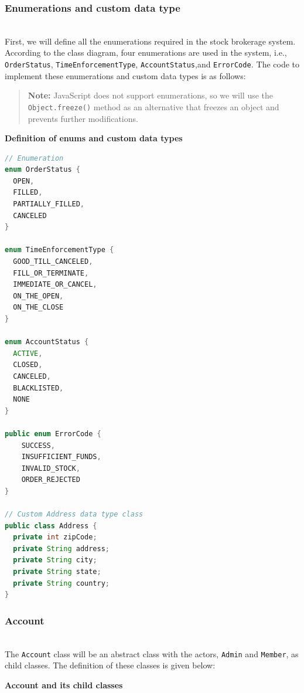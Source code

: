 \subsubsection{Enumerations and custom data type}\label{rOVMnzwZwv3Sg9LbBzNXQ}
\\
First, we will define all the enumerations required in the stock brokerage system. According to the class diagram, four enumerations are used in the system, i.e., \texttt{OrderStatus}, \texttt{TimeEnforcementType}, \texttt{AccountStatus},and \texttt{ErrorCode}\emph{.} The code to implement these enumerations and custom data types is as follows:
\begin{quote}
\textbf{Note:} JavaScript does not support enumerations, so we will use the \texttt{Object.freeze()} method as an alternative that freezes an object and prevents further modifications.
\end{quote}

\textbf{Definition of enums and custom data types}

\begin{lstlisting}[language=Java]
// Enumeration
enum OrderStatus {
  OPEN, 
  FILLED, 
  PARTIALLY_FILLED, 
  CANCELED
}

enum TimeEnforcementType {
  GOOD_TILL_CANCELED, 
  FILL_OR_TERMINATE, 
  IMMEDIATE_OR_CANCEL, 
  ON_THE_OPEN,
  ON_THE_CLOSE
}

enum AccountStatus {
  ACTIVE, 
  CLOSED, 
  CANCELED, 
  BLACKLISTED, 
  NONE
}

public enum ErrorCode {
    SUCCESS,
    INSUFFICIENT_FUNDS,
    INVALID_STOCK,
    ORDER_REJECTED
}

// Custom Address data type class
public class Address {
  private int zipCode;
  private String address;
  private String city;
  private String state;
  private String country;
}
\end{lstlisting}

\subsubsection{Account}\label{J-I53vTuIEEZkuWsUQZsK}
\\
The \texttt{Account} class will be an abstract class with the actors, \texttt{Admin} and \texttt{Member}, as child classes. The definition of these classes is given below:

\textbf{Account and its child classes}

